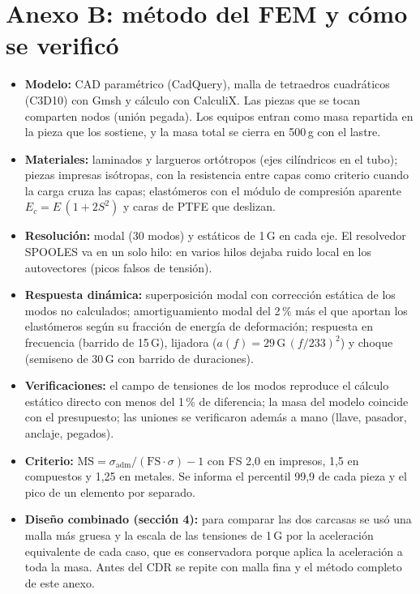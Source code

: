 \documentclass[10pt,a4paper]{article}
\begin{document}
\section{Anexo B: método del FEM y cómo se verificó}
\begin{itemize}
\item \textbf{Modelo:} CAD paramétrico (CadQuery), malla de tetraedros cuadráticos (C3D10) con Gmsh y cálculo con CalculiX.
Las piezas que se tocan comparten nodos (unión pegada). Los equipos entran como masa repartida en la pieza que los sostiene,
y la masa total se cierra en 500\,g con el lastre.
\item \textbf{Materiales:} laminados y largueros ortótropos (ejes cilíndricos en el tubo); piezas impresas isótropas, con la
resistencia entre capas como criterio cuando la carga cruza las capas; elastómeros con el módulo de compresión aparente
$E_c = E\,(1 + 2S^2)$ y caras de PTFE que deslizan.
\item \textbf{Resolución:} modal (30 modos) y estáticos de 1\,G en cada eje. El resolvedor SPOOLES va en un solo hilo: en
varios hilos dejaba ruido local en los autovectores (picos falsos de tensión).
\item \textbf{Respuesta dinámica:} superposición modal con corrección estática de los modos no calculados; amortiguamiento
modal del 2\,\% más el que aportan los elastómeros según su fracción de energía de deformación; respuesta en frecuencia
(barrido de 15\,G), lijadora ($a(f) = 29\,\mathrm{G}\,(f/233)^2$) y choque (semiseno de 30\,G con barrido de duraciones).
\item \textbf{Verificaciones:} el campo de tensiones de los modos reproduce el cálculo estático directo con menos del 1\,\%
de diferencia; la masa del modelo coincide con el presupuesto; las uniones se verificaron además a mano (llave, pasador,
anclaje, pegados).
\item \textbf{Criterio:} $\mathrm{MS} = \sigma_\mathrm{adm}/(\mathrm{FS}\cdot\sigma) - 1$ con FS 2,0 en impresos, 1,5 en
compuestos y 1,25 en metales. Se informa el percentil 99,9 de cada pieza y el pico de un elemento por separado.
\item \textbf{Diseño combinado (sección 4):} para comparar las dos carcasas se usó una malla más gruesa y la escala de las
tensiones de 1\,G por la aceleración equivalente de cada caso, que es conservadora porque aplica la aceleración a toda la
masa. Antes del CDR se repite con malla fina y el método completo de este anexo.
\end{itemize}
\end{document}
